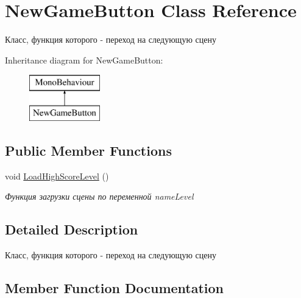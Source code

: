 \hypertarget{class_new_game_button}{}\section{New\+Game\+Button Class Reference}
\label{class_new_game_button}


Класс, функция которого -\/ переход на следующую сцену  


Inheritance diagram for New\+Game\+Button\+:\begin{figure}[H]
\begin{center}
\leavevmode
\includegraphics[height=2.000000cm]{class_new_game_button}
\end{center}
\end{figure}
\subsection*{Public Member Functions}
\begin{DoxyCompactItemize}
\item 
void \mbox{\hyperlink{class_new_game_button_aec7029f42fc0de5cf7f50952f3b4d3fd}{Load\+High\+Score\+Level}} ()
\begin{DoxyCompactList}\small\item\em Функция загрузки сцены по переменной name\+Level \end{DoxyCompactList}\end{DoxyCompactItemize}


\subsection{Detailed Description}
Класс, функция которого -\/ переход на следующую сцену 



\subsection{Member Function Documentation}
\mbox{\label{class_new_game_button_aec7029f42fc0de5cf7f50952f3b4d3fd}} 
